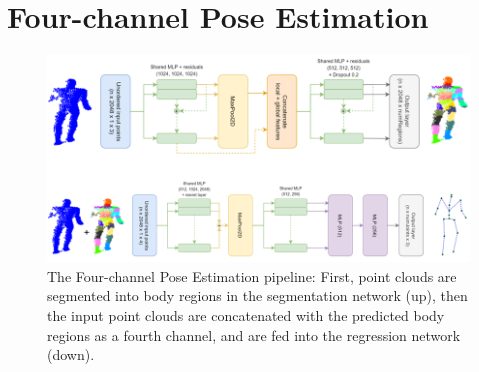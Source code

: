  \section{Four-channel Pose Estimation}

\vspace{5mm}
\begin{figure}[H]
\begin{center}
  \includegraphics[width=\textwidth]{images/implementation/4chan_pipeline.png}
  \caption[The Four-channel Pose Estimation pipeline.]{ The Four-channel Pose Estimation pipeline: First, point clouds are segmented into body regions in the segmentation network (up), then the input point clouds are concatenated with the predicted body regions as a fourth channel, and are fed into the regression network (down).}
  \label{fig:4chan_pipeline}
\end{center}
\end{figure}


